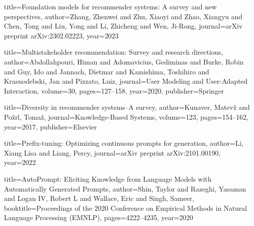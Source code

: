 \documentclass[12pt,letterpaper]{article}
\begin{document}

\begin{thebibliography}{99}

title={Foundation models for recommender systems: A survey and new perspectives},
      author={Zhang, Zhenwei and Zhu, Xiaoyi and Zhao, Xiangyu and Chen, Tong and Liu, Yong and Li, Zhicheng and Wen, Ji-Rong},
      journal={arXiv preprint arXiv:2302.02223},
      year={2023}
    

title={Multistakeholder recommendation: Survey and research directions},
      author={Abdollahpouri, Himan and Adomavicius, Gediminas and Burke, Robin and Guy, Ido and Jannach, Dietmar and Kamishima, Toshihiro and Krasnodebski, Jan and Pizzato, Luiz},
      journal={User Modeling and User-Adapted Interaction},
      volume={30},
      pages={127--158},
      year={2020},
      publisher={Springer}
    

title={Diversity in recommender systems--A survey},
      author={Kunaver, Matev{\v{z}} and Po{\v{z}}rl, Toma{\v{z}}},
      journal={Knowledge-Based Systems},
      volume={123},
      pages={154--162},
      year={2017},
      publisher={Elsevier}
    

title={Prefix-tuning: Optimizing continuous prompts for generation},
      author={Li, Xiang Lisa and Liang, Percy},
      journal={arXiv preprint arXiv:2101.00190},
      year={2022}
    

title={AutoPrompt: Eliciting Knowledge from Language Models with Automatically Generated Prompts},
      author={Shin, Taylor and Razeghi, Yasaman and Logan IV, Robert L and Wallace, Eric and Singh, Sameer},
      booktitle={Proceedings of the 2020 Conference on Empirical Methods in Natural Language Processing (EMNLP)},
      pages={4222--4235},
      year={2020}
    

\end{thebibliography}
\end{document}
